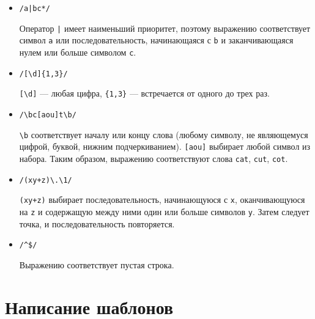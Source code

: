 \documentclass[listings]{labreport}
\begin{document}
\begin{itemize}
\item \verb=/a|bc*/=

Оператор \verb=|= имеет наименьший приоритет, поэтому выражению соответствует
символ \texttt{a} или последовательность, начинающаяся с \texttt{b} и заканчивающаяся
нулем или больше символом \texttt{c}.

\item \verb=/[\d]{1,3}/=

\verb|[\d]| — любая цифра, \verb|{1,3}| — встречается от одного до трех раз.

\item \verb=/\bc[aou]t\b/=

\verb|\b| соответствует началу или концу слова (любому символу, не являющемуся
цифрой, буквой, нижним подчеркиванием). \verb|[aou]| выбирает любой символ из набора.
Таким образом, выражению соответствуют слова \texttt{cat}, \texttt{cut}, \texttt{cot}.

\item \verb=/(xy+z)\.\1/=

\verb|(xy+z)| выбирает последовательность, начинающуюся с \texttt{x}, оканчивающуюся
на \texttt{z} и содержащую между ними один или больше символов \texttt{y}. Затем
следует точка, и последовательность повторяется.

\item \verb=/^$/=

Выражению соответствует пустая строка.

\end{itemize}

\section*{Написание шаблонов}
\end{document}
